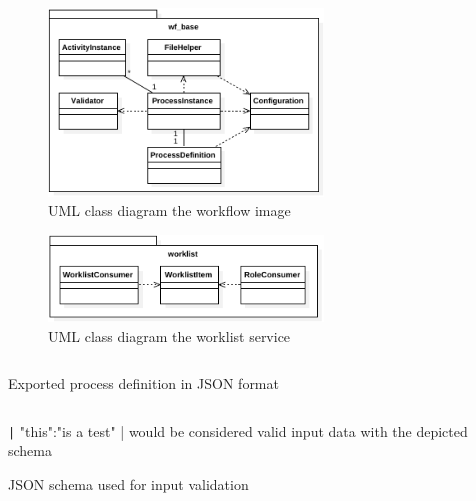   \begin{figure}[htbp]
    \centering
    \includegraphics[width=0.65\textwidth]{content/images/class_diagram_wf_base-crop.pdf}
    \caption{UML class diagram the workflow image}
    \label{fig:class_diagram_wf_base}
  \end{figure}

  \begin{figure}[htbp]
    \centering
    \includegraphics[width=0.65\textwidth]{content/images/class_diagram_worklist-crop.pdf}
    \caption{UML class diagram the worklist service}
    \label{fig:class_diagram_worklist}
  \end{figure}

 \clearpage
{}

    \begin{listing}[!h]
      \inputminted[fontsize=\footnotesize,linenos=true,numberblanklines=true,showspaces=false,breaklines=true,baselinestretch=1]{json}{./content/snippets/process_definition.json}
      \caption{Exported process definition in JSON format}
    \label{lst:exported_process_definition_in_json_format}
    \end{listing}

    \begin{listing}[!h]
      \inputminted[fontsize=\footnotesize,linenos=true,numberblanklines=true,showspaces=false,breaklines=true,baselinestretch=1]{json}{./content/snippets/wf_image/input.schema.json}
      \caption*{ \texttt| {"this":"is a test"} | would be considered valid input data with the depicted schema }
      \caption{JSON schema used for input validation}
    \label{lst:input_schema_in_json_format}
    \end{listing}

